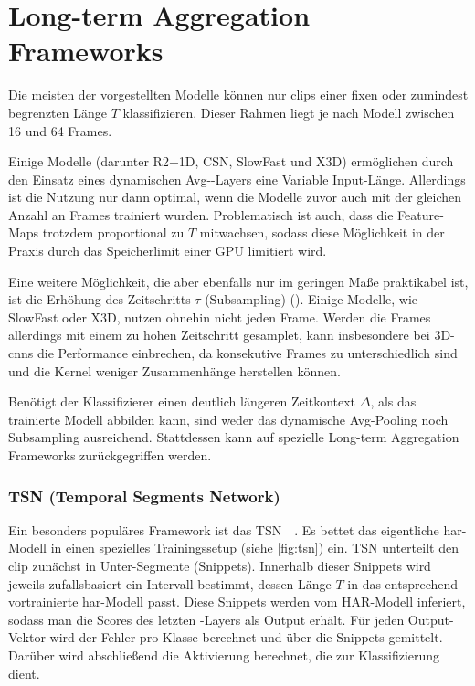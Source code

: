 \section{Long-term Aggregation Frameworks}
\label{sec:long-term-aggregation-frameworks}

Die meisten der vorgestellten Modelle können nur \glspl{clip} einer fixen oder zumindest begrenzten Länge $T$ klassifizieren.
Dieser Rahmen liegt je nach Modell zwischen 16 und 64 Frames.

Einige Modelle (darunter R2+1D, CSN, SlowFast und X3D) ermöglichen durch den Einsatz eines dynamischen Avg-\pool-Layers eine Variable Input-Länge.
Allerdings ist die Nutzung nur dann optimal, wenn die Modelle zuvor auch mit der gleichen Anzahl an Frames trainiert wurden.
Problematisch ist auch, dass die Feature-Maps trotzdem proportional zu $T$ mitwachsen, sodass diese Möglichkeit in der Praxis \zB durch das Speicherlimit einer GPU limitiert wird.

Eine weitere Möglichkeit, die aber ebenfalls nur im geringen Maße praktikabel ist, ist die Erhöhung des Zeitschritts $\tau$ (Subsampling) (\cite{Ng15}).
Einige Modelle, wie SlowFast oder X3D, nutzen ohnehin nicht jeden Frame.
Werden die Frames allerdings mit einem zu hohen Zeitschritt gesamplet, kann insbesondere bei 3D-\glspl{cnn} die Performance einbrechen, da konsekutive Frames zu unterschiedlich sind und die Kernel weniger Zusammenhänge herstellen können.

Benötigt der Klassifizierer einen deutlich längeren Zeitkontext $\Delta$, als das trainierte Modell abbilden kann, sind weder das dynamische Avg-Pooling noch Subsampling ausreichend.
Stattdessen kann auf spezielle Long-term Aggregation Frameworks zurückgegriffen werden.

\subsubsection*{TSN (Temporal Segments Network)}

Ein besonders populäres Framework ist das TSN~\cite{Wang16}~\cite{Wang19}.
Es bettet das eigentliche \gls{har}-Modell in einen spezielles Trainingssetup (siehe \autoref{fig:tsn}) ein.
TSN unterteilt den \gls{clip} zunächst in Unter-Segmente (Snippets).
Innerhalb dieser Snippets wird jeweils zufallsbasiert ein Intervall bestimmt, dessen Länge $T$ in das entsprechend vortrainierte \gls{har}-Modell passt.
Diese Snippets werden vom HAR-Modell inferiert, sodass man die Scores des letzten \fc-Layers als Output erhält.
Für jeden Output-Vektor wird der Fehler pro Klasse berechnet und über die Snippets gemittelt.
Darüber wird abschließend die Aktivierung berechnet, die zur Klassifizierung dient.


